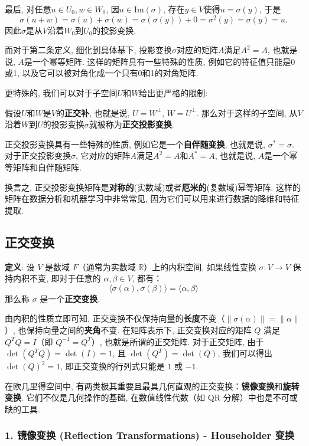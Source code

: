 \documentclass{ctexart}
\begin{document}
最后, 对任意$u \in U_0, w \in W_0$, 因$u \in \text{Im}(\sigma)$, 存在$y \in V$使得$u = \sigma(y)$, 于是
$$\sigma(u + w) = \sigma(u) + \sigma(w) = \sigma(\sigma(y)) + 0 = \sigma^2(y) = \sigma(y) = u.$$
因此$\sigma$是从$V$沿着$W_0$到$U_0$的投影变换.

而对于第二条定义, 细化到具体基下, 投影变换$\sigma$对应的矩阵$A$满足$A^2 = A$, 也就是说, $A$是一个幂等矩阵. 这样的矩阵具有一些特殊的性质, 例如它的特征值只能是0或1, 以及它可以被对角化成一个只有0和1的对角矩阵.

更特殊的, 我们可以对于子空间$U$和$W$给出更严格的限制:

假设$U$和$W$是$V$的\textbf{正交补}, 也就是说, $U = W^\perp$, $W = U^\perp$. 那么对于这样的子空间, 从$V$沿着$W$到$U$的投影变换$\sigma$就被称为\textbf{正交投影变换}.

正交投影变换具有一些特殊的性质, 例如它是一个\textbf{自伴随变换}, 也就是说, $\sigma^* = \sigma$. 对于正交投影变换$\sigma$, 它对应的矩阵$A$满足$A^2 = A$和$A^* = A$, 也就是说, $A$是一个幂等矩阵和自伴随矩阵.

换言之, 正交投影变换矩阵是\textbf{对称的}(实数域)或者\textbf{厄米的}(复数域)幂等矩阵. 这样的矩阵在数据分析和机器学习中非常常见, 因为它们可以用来进行数据的降维和特征提取.

\subsection{正交变换}

\textbf{定义}: 设 $V$ 是数域 $F$（通常为实数域 $\mathbb{R}$）上的内积空间, 如果线性变换 $\sigma: V \to V$ 保持内积不变, 即对于任意的 $\alpha, \beta \in V$, 都有：
$$\langle \sigma(\alpha), \sigma(\beta) \rangle = \langle \alpha, \beta \rangle$$
那么称 $\sigma$ 是一个\textbf{正交变换}.

由内积的性质立即可知, 正交变换不仅保持向量的\textbf{长度}不变（$\|\sigma(\alpha)\| = \|\alpha\|$）, 也保持向量之间的\textbf{夹角}不变. 在矩阵表示下, 正交变换对应的矩阵 $Q$ 满足 $Q^T Q = I$（即 $Q^{-1} = Q^T$）, 也就是所谓的正交矩阵. 对于正交矩阵, 由于 $\det(Q^T Q) = \det(I) = 1$, 且 $\det(Q^T) = \det(Q)$, 我们可以得出 $\det(Q)^2 = 1$, 即正交变换的行列式只能是 $1$ 或 $-1$.

在欧几里得空间中, 有两类极其重要且最具几何直观的正交变换：\textbf{镜像变换}和\textbf{旋转变换}. 它们不仅是几何操作的基础, 在数值线性代数（如 QR 分解）中也是不可或缺的工具.

\subsubsection{1. 镜像变换 (Reflection Transformations) - Householder 变换}
\end{document}
